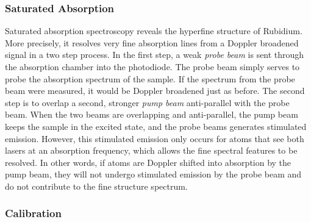 \documentclass[12pt]{article}
\begin{document}
	\subsubsection*{Saturated Absorption}

	Saturated absorption spectroscopy reveals the hyperfine structure of Rubidium. More precisely, it resolves very fine absorption lines from a Doppler broadened signal in a two step process. In the first step, a weak \emph{probe beam} is sent through the absorption chamber into the photodiode. The probe beam simply serves to probe the absorption spectrum of the sample. If the spectrum from the probe beam were measured, it would be Doppler broadened just as before. The second step is to overlap a second, stronger \emph{pump beam} anti-parallel with the probe beam. When the two beams are overlapping and anti-parallel, the pump beam keeps the sample in the excited state, and the probe beams generates stimulated emission. However, this stimulated emission only occurs for atoms that see both lasers at an absorption frequency, which allows the fine spectral features to be resolved. In other words, if atoms are Doppler shifted into absorption by the pump beam, they will not undergo stimulated emission by the probe beam and do not contribute to the fine structure spectrum.
	
	\subsubsection*{Calibration}
		
\end{document}
